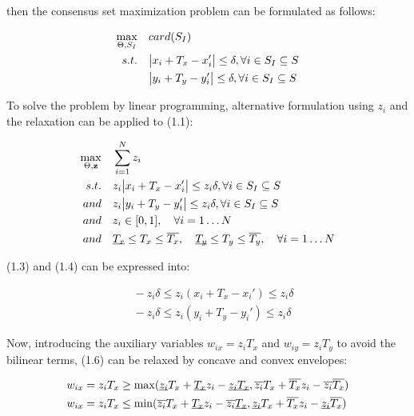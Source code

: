 \documentclass[paper=a4, fontsize=11pt]{scrartcl} %
\numberwithin{equation}{section} %
\numberwithin{figure}{section} %
\numberwithin{table}{section} %
\renewcommand{\vec}[1]{\mathbf{#1}}
\begin{document}
then the consensus set maximization problem can be formulated as follows: 

\begin{equation}
\begin{split}
\max_{\Theta, S_{I}} &\quad card(S_{I}) \\
s.t. 	&\quad \abs{x_{i} + T_{x} - x_{i}'} \leq \delta, \forall i \in S_{I} \subseteq S \\
	&\quad \abs{y_{i} + T_{y} - y_{i}'} \leq \delta, \forall i \in S_{I} \subseteq S
\end{split}
\end{equation}

To solve the problem by linear programming, alternative formulation using $z_{i}$ and the relaxation can be applied to (1.1):

\begin{align}
\max_{\Theta, \vec{z}} &\quad \sum_{i=1}^{N} z_{i} \\
s.t. 	&\quad z_{i}\abs{x_{i} + T_{x} - x_{i}'} \leq z_{i} \delta, \forall i \in S_{I} \subseteq S \\
	and &\quad z_{i}\abs{y_{i} + T_{y} - y_{i}'} \leq z_{i} \delta, \forall i \in S_{I} \subseteq S \\
	and &\quad z_{i} \in [0, 1], \quad \forall i = 1 \dots N \\
	and &\quad \underbar{$T_{x}$} \leq T_{x} \leq \overline{T_{x}},
	\quad \underbar{$T_{y}$} \leq T_{y} \leq \overline{T_{y}}, \quad \forall i = 1 \dots N 
\end{align}

(1.3) and (1.4) can be expressed into:

\begin{equation}
\begin{split}
\quad - z_{i} \delta \leq z_{i} (x_{i} + T_{x} - x_{i}') \leq z_{i} \delta \\
\quad - z_{i} \delta \leq z_{i} (y_{i} + T_{y} - y_{i}') \leq z_{i} \delta 
\end{split}
\end{equation}

Now, introducing the auxiliary variables $w_{ix} = z_{i}T_{x}$ and $w_{iy} = z_{i}T_{y}$ to avoid the bilinear terms, (1.6) can be relaxed by concave and convex envelopes:

\begin{equation}
\begin{split}
w_{ix} = z_{i} T_{x} &\geq \max(\underbar{$z_{i}$} T_{x} + \underbar{$T_{x}$}z_{i} - \underbar{$z_{i}$}\underbar{$T_{x}$},
 	\overline{z_{i}} T_{x} + \overline{T_{x}}z_{i} - \overline{z_{i}} \overline{T_{x}}) \\
w_{ix} = z_{i} T_{x} &\leq \min(\overline{z_{i}}T_{x} + \underbar{$T_{x}$}z_{i} - \overline{z_{i}} \underbar{$T_{x}$}, 
	 \underbar{$z_{i}$} T_{x} + \overline{T_{x}}z_{i} - \underbar{$z_{i}$} \overline{T_{x}})
\end{split}
\end{equation}
\end{document}
